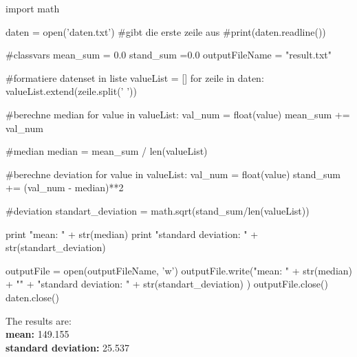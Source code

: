 \begin{python}[caption={Python code for median and standard deviation}]
import math

daten = open('daten.txt')
#gibt die erste zeile aus
#print(daten.readline()) 

#classvars
mean_sum = 0.0 
stand_sum =0.0
outputFileName = "result.txt"

#formatiere datenset in liste
valueList = []
for zeile in daten:
    valueList.extend(zeile.split(' '))

#berechne median
for value in  valueList:
    val_num = float(value)   
    mean_sum += val_num
    
#median
median = mean_sum / len(valueList)

#berechne deviation
for value in  valueList:
    val_num = float(value)
    stand_sum += (val_num - median)**2
    
#deviation
standart_deviation = math.sqrt(stand_sum/len(valueList))
    
print "mean:               " + str(median)
print "standard deviation: " + str(standart_deviation)

outputFile = open(outputFileName, 'w')
outputFile.write("mean:               " + str(median) + "\n" + "standard deviation: " + str(standart_deviation) )
outputFile.close()
daten.close()
\end{python}
The results are:\\
\textbf{mean:				}   149.155 \\        
\textbf {standard deviation:} 	25.537